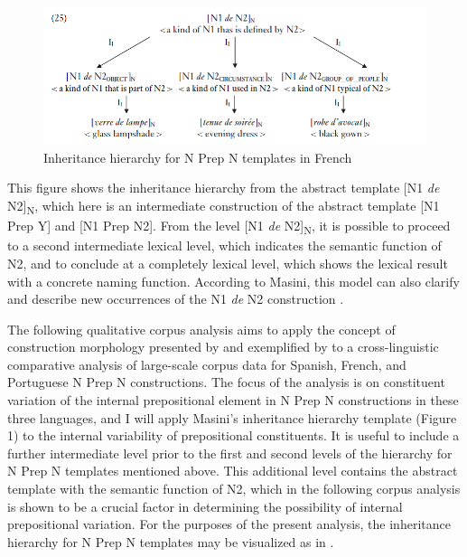 \documentclass[output=paper]{langsci/langscibook}
\begin{document}
\begin{figure}
\caption{Inheritance hierarchy for N Prep N templates in French \citep[263]{Masini:2009} }
\includegraphics[scale=0.5]{figures/Masinifigure2.png} 
\end{figure}

This figure shows the inheritance hierarchy from the abstract template [N1 \textit{de} N2]\textsubscript{N}, which here is an intermediate construction of the abstract template [N1 Prep Y] and [N1 Prep N2]. From the level [N1 \textit{de} N2]\textsubscript{N}, it is possible to proceed to a second intermediate lexical level, which indicates the semantic function of N2, and to conclude at a completely lexical level, which shows the lexical result with a concrete naming function. According to Masini, this model can also clarify and describe new occurrences of the N1 \textit{de} N2 construction \citep[263]{Masini:2009}. 

The following qualitative corpus analysis aims to apply the concept of construction morphology presented by \citet{Booij:2010,Booij:2015} and exemplified by \citet{Masini:2009} to a cross-linguistic comparative analysis of large-scale corpus data for Spanish, French, and Portuguese N Prep N constructions. The focus of the analysis is on constituent variation of the internal prepositional element in N Prep N constructions in these three languages, and I will apply Masini's inheritance hierarchy template (Figure 1) to the internal variability of prepositional constituents. It is useful to include a further intermediate level prior to the first and second levels of the hierarchy for N Prep N templates mentioned above. This additional level contains the abstract template with the semantic function of N2, which in the following corpus analysis is shown to be a crucial factor in determining the possibility of internal prepositional variation. For the purposes of the present analysis, the inheritance hierarchy for N Prep N templates may be visualized as in .
\end{document}
